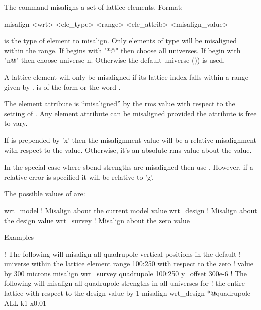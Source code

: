 The  command misaligns a set of lattice elements. Format:
\begin{example}
   misalign <wrt> <ele_type> <range> <ele_attrib> <misalign_value>
\end{example}

\vskip 0.2in 

 is the type of element to misalign.  Only
elements of type  will be misaligned within the range.
If  begins with "*@" then choose all universes. If
 begin with "n@" then choose universe n. Otherwise the
default universe ()) is used.

A lattice element will only be misaligned if its lattice index falls within
a range given by .  is of the form
 or the word . 

The element attribute  is ``misaligned'' by the rms
value  with respect to the setting of
. Any element attribute can be misaligned provided the
attribute is free to vary.

If  is prepended by 'x' then the misalignment value will be
a relative misalignment with respect to the  value. Otherwise, it's an 
absolute rms value about the  value.

In the special case where sbend strengths are misaligned then use
. However, if a relative error is specified it will be 
relative to 'g'.

The possible values of  are:
\begin{example}
  wrt_model          ! Misalign about the current model value
  wrt_design         ! Misalign about the design value
  wrt_survey         ! Misalign about the zero value
\end{example}

Examples
\begin{example}
   ! The following will misalign all quadrupole vertical positions in the default
   ! universe within the lattice element range 100:250 with respect to the zero 
   ! value by 300 microns
  misalign wrt_survey quadrupole 100:250 y_offset 300e-6
   ! The following will misalign all quadrupole strengths in all universes for
   ! the entire lattice with respect to the design value by 1%
  misalign wrt_design *@quadrupole ALL k1 x0.01
\end{example}

